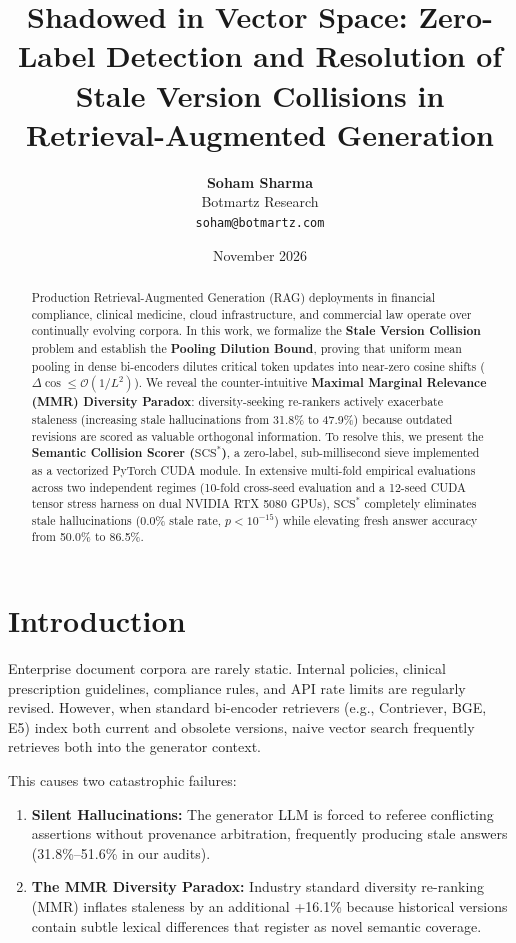 \documentclass[11pt,a4paper]{article}
\title{\textbf{Shadowed in Vector Space: Zero-Label Detection and Resolution of Stale Version Collisions in Retrieval-Augmented Generation}}
\author{
  \textbf{Soham Sharma}\\
  Botmartz Research\\
  \texttt{soham@botmartz.com}
}
\date{November 2026}
\theoremstyle{definition}
\begin{document}
\maketitle

\begin{abstract}
Production Retrieval-Augmented Generation (RAG) deployments in financial compliance, clinical medicine, cloud infrastructure, and commercial law operate over continually evolving corpora. In this work, we formalize the \textbf{Stale Version Collision} problem and establish the \textbf{Pooling Dilution Bound}, proving that uniform mean pooling in dense bi-encoders dilutes critical token updates into near-zero cosine shifts ($\Delta \cos \le \mathcal{O}(1/L^2)$). We reveal the counter-intuitive \textbf{Maximal Marginal Relevance (MMR) Diversity Paradox}: diversity-seeking re-rankers actively exacerbate staleness (increasing stale hallucinations from 31.8\% to 47.9\%) because outdated revisions are scored as valuable orthogonal information. To resolve this, we present the \textbf{Semantic Collision Scorer ($\text{SCS}^*$)}, a zero-label, sub-millisecond sieve implemented as a vectorized PyTorch CUDA module. In extensive multi-fold empirical evaluations across two independent regimes (10-fold cross-seed evaluation and a 12-seed CUDA tensor stress harness on dual NVIDIA RTX 5080 GPUs), $\text{SCS}^*$ completely eliminates stale hallucinations ($0.0\%$ stale rate, $p < 10^{-15}$) while elevating fresh answer accuracy from 50.0\% to 86.5\%.
\end{abstract}

\section{Introduction}
Enterprise document corpora are rarely static. Internal policies, clinical prescription guidelines, compliance rules, and API rate limits are regularly revised. However, when standard bi-encoder retrievers (e.g., Contriever, BGE, E5) index both current and obsolete versions, naive vector search frequently retrieves both into the generator context. 

This causes two catastrophic failures:
\begin{enumerate}
    \item \textbf{Silent Hallucinations:} The generator LLM is forced to referee conflicting assertions without provenance arbitration, frequently producing stale answers (31.8\%--51.6\% in our audits).
    \item \textbf{The MMR Diversity Paradox:} Industry standard diversity re-ranking (MMR) inflates staleness by an additional +16.1\% because historical versions contain subtle lexical differences that register as novel semantic coverage.
\end{enumerate}
\end{document}
